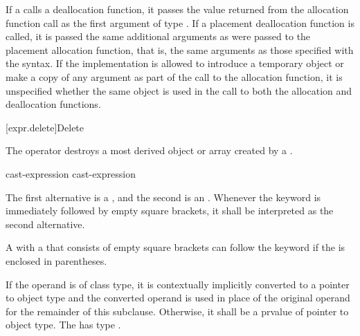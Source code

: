 \pnum
If a  calls a deallocation function, it passes
the value returned from the allocation function call as the first
argument of type . If a placement deallocation function is
called, it is passed the same additional arguments as were passed to the
placement allocation function, that is, the same arguments as those
specified with the  syntax.
If the implementation is allowed
to introduce a temporary object or make a copy of any argument
as part of the call to the allocation function,
it is unspecified whether the same object is used in the call
to both the allocation and deallocation functions.

[expr.delete]{Delete}

\pnum
{}%
%
The  operator destroys a most derived
object or array created by a
.

\begin{bnf}
\br
    \opt{\terminal{::}}  cast-expression\br
    \opt{\terminal{::}}  \terminal{[} \terminal{]} cast-expression
\end{bnf}

The first alternative is a
, and the
second is an .
Whenever the  keyword is immediately followed by empty square
brackets, it shall be interpreted as the second alternative.
\begin{footnote}
A
 with a 
that consists of empty square brackets can follow the  keyword
if the  is enclosed in parentheses.
\end{footnote}
If the operand is of
class type, it is contextually implicitly converted
to a pointer to object
type
and the converted operand is used in place of the original operand
for the remainder of this subclause.
Otherwise, it shall be a prvalue of pointer to object type.
The  has type
.

